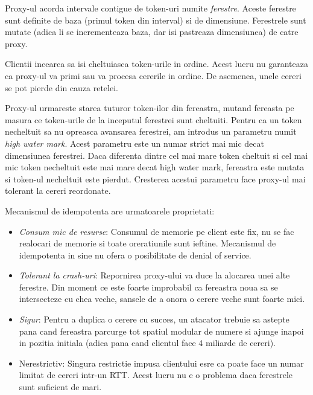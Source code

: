 Proxy-ul acorda intervale contigue de token-uri numite \emph{ferestre}. Aceste ferestre sunt definite de baza (primul token din interval) si de dimensiune.
Ferestrele sunt mutate (adica li se incrementeaza baza, dar isi pastreaza dimensiunea) de catre proxy.

Clientii incearca sa isi cheltuiasca token-urile in ordine. Acest lucru nu garanteaza ca proxy-ul va primi sau va procesa cererile in ordine. De asemenea, unele cereri se pot pierde din cauza retelei.

Proxy-ul urmareste starea tuturor token-ilor din fereastra, mutand fereasta pe masura ce token-urile de la inceputul ferestrei sunt cheltuiti.
Pentru ca un token necheltuit sa nu opreasca avansarea ferestrei, am introdus un parametru numit \emph{high water mark}. Acest parametru
este un numar strict mai mic decat dimensiunea ferestrei. Daca diferenta dintre cel mai mare token cheltuit si cel mai mic token necheltuit este mai
mare decat high water mark, fereastra este mutata si token-ul necheltuit este pierdut. Cresterea acestui parametru face proxy-ul mai tolerant la cereri reordonate.

Mecanismul de idempotenta are urmatoarele proprietati:
\begin{itemize}
    \item \emph{Consum mic de resurse}: Consumul de memorie pe client este fix, nu se fac realocari de memorie si toate oreratiunile sunt ieftine.
    Mecanismul de idempotenta in sine nu ofera o posibilitate de denial of service.
    \item \emph{Tolerant la crash-uri}: Repornirea proxy-ului va duce la alocarea unei alte ferestre. Din moment ce este foarte improbabil ca
    fereastra noua sa se intersecteze cu chea veche, sansele de a onora o cerere veche sunt foarte mici.
    \item \emph{Sigur}: Pentru a duplica o cerere cu succes, un atacator trebuie sa astepte pana cand fereastra parcurge tot spatiul modular de numere si ajunge inapoi in pozitia initiala
    (adica pana cand clientul face 4 miliarde de cereri).
    \item {Nerestrictiv}: Singura restrictie impusa clientului esre ca poate face un numar limitat de cereri intr-un RTT. Acest lucru nu e o problema daca ferestrele sunt suficient de mari.
\end{itemize}


